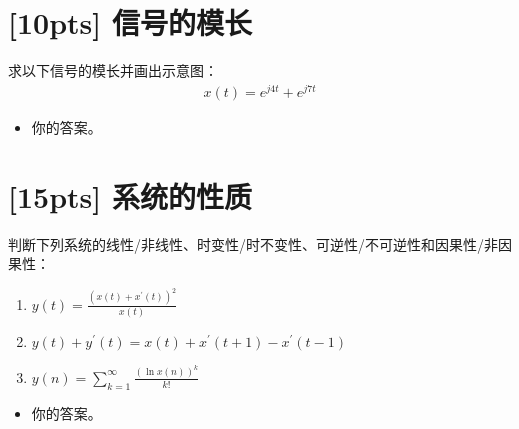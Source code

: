 \documentclass[a4paper,UTF8]{article}
\numberwithin{equation}{section}
\begin{document}
\newpage
\section{[10pts] 信号的模长}
求以下信号的模长并画出示意图：
\begin{equation*}
    \begin{aligned}
        x(t)=e^{j4t}+e^{j7t}
    \end{aligned}
\end{equation*}

\begin{framed}
    \begin{spacing}{1.5}
        \begin{itemize}
            \item 你的答案。
        \end{itemize}
    \end{spacing}
\end{framed}


\newpage
\section{[15pts] 系统的性质 }
判断下列系统的线性/非线性、时变性/时不变性、可逆性/不可逆性和因果性/非因果性：
\begin{enumerate}[(1)]
    \item $y(t)=\displaystyle\frac{(x(t)+x^{\prime}(t))^2}{x(t)}$
    \item $y(t) +y^{\prime}(t)=x(t)+x^{\prime}(t+1)-x^{\prime}(t-1)$
    \item $y(n)=\displaystyle\sum^{\infty}_{k=1}\frac{(\ln x(n))^k}{k!}$
\end{enumerate}

\begin{framed}
    \begin{spacing}{1.5}
        \begin{itemize}
            \item 你的答案。
        \end{itemize}
    \end{spacing}
\end{framed}


\newpage
\end{document}

